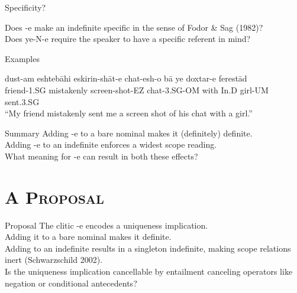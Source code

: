 \documentclass[10pt]{beamer}
\begin{document}
\begin {frame} {Specificity?}

Does -{\color {red}e} make an indefinite specific in the sense of Fodor \& Sag (1982)? \\
Does ye-N-{\color {red}e} require the speaker to have a specific referent in mind? \pause

\begin {exampleblock} {Examples}
	\begin {exe}
		\ex \label{} \gll	dust-am eshteb\={a}hi eskirin-sh\={a}t-e chat-esh-o b\={a} ye doxtar-{\color{red}e} ferest\={a}d \\
			friend-{\scriptsize 1.SG} mistakenly screen-shot-{\scriptsize EZ}	chat-{\scriptsize 3.SG-OM} with {\scriptsize In.D}	girl-{\scriptsize UM} sent{\scriptsize .3.SG}\\
			``My friend mistakenly sent me a screen shot of his chat with a girl.''  \\
	\end {exe}
\end {exampleblock}

\end {frame}

\begin {frame} {Summary}
Adding -{\color {red}e} to a bare nominal makes it (definitely) definite. \\
Adding -{\color {red}e} to an indefinite enforces a widest scope reading. \\ \pause
What meaning for -{\color {red}e} can result in both these effects? \\
\end {frame}

\section {\scshape A Proposal}

\begin {frame} {Proposal}
The clitic -{\color {red}e} encodes a uniqueness implication. \\ \pause
Adding it to a bare nominal makes it definite. \\ \pause
Adding to an indefinite results in a singleton indefinite, making scope relations inert (Schwarzschild 2002). \\ \pause
Is the uniqueness implication cancellable by entailment canceling operators like negation or conditional antecedents? 
\end {frame}
\end{document}
